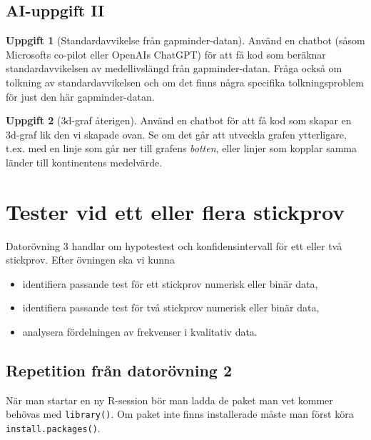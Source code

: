 \documentclass[
]{book}
\providecommand{\tightlist}{%
  \setlength{\itemsep}{0pt}\setlength{\parskip}{0pt}}
\theoremstyle{definition}
\theoremstyle{definition}
\theoremstyle{definition}
\newtheorem{exercise}{Uppgift}[chapter]
\theoremstyle{definition}
\theoremstyle{remark}
\begin{document}
\section{AI-uppgift II}\label{ai-uppgift-ii}

\begin{exercise}[Standardavvikelse från gapminder-datan]
Använd en chatbot (såsom Microsofts co-pilot eller OpenAIs ChatGPT) för att få kod som beräknar standardavvikelsen av medellivslängd från gapminder-datan. Fråga också om tolkning av standardavvikelsen och om det finns några specifika tolkningsproblem för just den här gapminder-datan.
\end{exercise}

\begin{exercise}[3d-graf återigen]
Använd en chatbot för att få kod som skapar en 3d-graf lik den vi skapade ovan. Se om det går att utveckla grafen ytterligare, t.ex. med en linje som går ner till grafens \emph{botten}, eller linjer som kopplar samma länder till kontinentens medelvärde.
\end{exercise}

\chapter{Tester vid ett eller flera stickprov}\label{tester-vid-ett-eller-flera-stickprov}

Datorövning 3 handlar om hypotestest och konfidensintervall för ett eller två stickprov. Efter övningen ska vi kunna

\begin{itemize}
\tightlist
\item
  identifiera passande test för ett stickprov numerisk eller binär data,
\item
  identifiera passande test för två stickprov numerisk eller binär data,
\item
  analysera fördelningen av frekvenser i kvalitativ data.
\end{itemize}

\section{Repetition från datorövning 2}\label{repetition-fruxe5n-datoruxf6vning-2}

När man startar en ny R-session bör man ladda de paket man vet kommer behövas med \texttt{library()}. Om paket inte finns installerade måste man först köra \texttt{install.packages()}.
\end{document}
